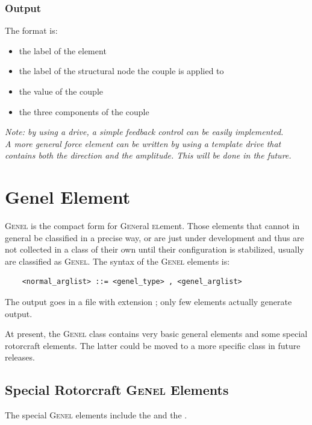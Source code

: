 \subsubsection{Output}
The format is:
\begin{itemize}
    \item the label of the element
    \item the label of the structural node the couple is applied to
    \item the value of the couple
    \item the three components of the couple
\end{itemize}


\noindent
{\em 
Note: by using a  drive, a simple feedback control can be easily
implemented. \\
A more general force element can be written by using a template drive
that contains both the direction and the amplitude. This will be done in the
future. 
}





\section{Genel Element}
\textsc{Genel} is the compact form for \textsc{Gen}eral \textsc{el}ement.
Those elements that cannot in general be classified in a precise way, 
or are just under development and thus are not collected in a class 
of their own until their configuration is stabilized, usually are
classified as \textsc{Genel}.
The syntax of the \textsc{Genel} elements is:
\begin{verbatim}
    <normal_arglist> ::= <genel_type> , <genel_arglist>
\end{verbatim}

\noindent
The output goes in a file with extension ; only few elements
actually generate output.

\noindent
At present, the \textsc{Genel} class contains very basic general elements
and some special rotorcraft elements.
The latter could be moved to a more specific class in future releases.

\subsection{Special Rotorcraft \textsc{Genel} Elements}
The special \textsc{Genel} elements include the 
and the .

